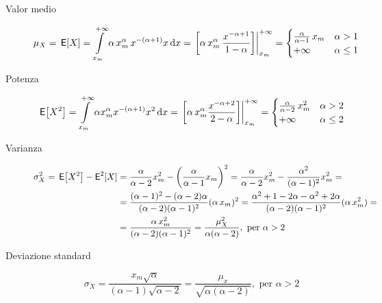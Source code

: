 \begin{description}
\item[Valor medio]
\begin{equation}
	\mu_X = \E{X} = \intd{x_m}{+\infty}{\alpha\,x_m^\alpha\,x^{-(\alpha +1)} x}{x} =
	\bound{x_m}{+\infty}{\alpha\,x_m^\alpha\,\frac{x^{-\alpha +1}}{1-\alpha}} =
	\begin{cases}
		\frac{\alpha}{\alpha -1}\,x_m & \alpha > 1 \\
		+\infty & \alpha \leq 1
	\end{cases}
\end{equation}

\item[Potenza]
\begin{equation}
	\E{X^2} = \intd{x_m}{+\infty}{\alpha x_m^\alpha x^{-(\alpha +1)} x^2}{x} =
	\bound{x_m}{+\infty}{\alpha\, x_m^\alpha \frac{x^{-\alpha +2}}{2-\alpha}} =
	\begin{cases}
		\frac{\alpha}{\alpha -2}\,x_m^2 & \alpha > 2 \\
		+\infty & \alpha \leq 2
	\end{cases}
\end{equation}

\item[Varianza]
\begin{equation}\begin{split}
	\sigma_X^2 = \E{X^2} - \Esp^2[X] &=
		\frac{\alpha}{\alpha -2} x_m^2 - \left(\frac{\alpha}{\alpha -1} x_m \right)^2 =
		\frac{\alpha}{\alpha -2} x_m^2 - \frac{\alpha^2}{(\alpha - 1)^2} x_m^2 = \\
	&= \frac{(\alpha -1)^2 - (\alpha -2)\alpha}{(\alpha -2)(\alpha -1)^2}(\alpha\,x_m)^2 =
		\frac{\alpha^2 +1 -2\alpha -\alpha^2 +2\alpha}{(\alpha -2)(\alpha -1)^2} (\alpha\,x_m^2) = \\
	& = \frac{\alpha\,x_m^2}{(\alpha -2)(\alpha -1)^2} = \frac{\mu_X^2}{\alpha (\alpha -2)}, \text{ per } \alpha > 2
\end{split}\end{equation}

\item[Deviazione standard]
\begin{equation}
	\sigma_X = \frac{x_m \sqrt{\alpha}}{(\alpha -1) \sqrt{\alpha -2}} = \frac{\mu_x}{\sqrt{\alpha (\alpha -2)}}, \text{ per } \alpha > 2
\end{equation}
\end{description}

